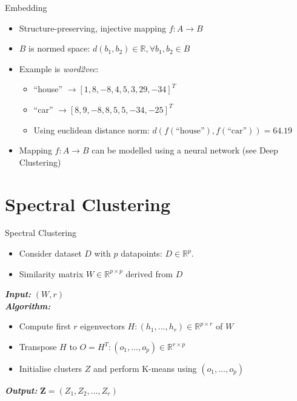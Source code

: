 \documentclass[xcolor=table,mathserif,9pt]{beamer}    %
\begin{document}
\begin{frame}{Embedding}

	\begin{itemize}
		\item Structure-preserving, injective mapping $f: A \to B$
		\item $B$ is normed space: $d(b_1,b_2) \in \mathbb{R}, \forall b_1,b_2 \in B$
		\item Example is \emph{word2vec}: 
			\begin{itemize}
				\item ``house'' $\to \left[1, 8, -8, 4, 5, 3, 29, -34\right]^{T}$
				\item ``car'' $\to \left[8,9, -8, 8, 5, 5, -34, -25\right]^{T}$
				\item Using euclidean distance norm: $d(f(\text{``house''}),f(\text{``car''})) = 64.19$ 
			\end{itemize}
		\item Mapping $f: A \to B$ can be modelled using a neural network (see Deep Clustering)
	\end{itemize}



\end{frame}

\section{Spectral Clustering}%
\label{sec:spectral_clustering}

\begin{frame}{Spectral Clustering}
\begin{itemize}
	\item Consider dataset $D$ with $p$ datapoints: $D \in \mathbb{R}^p$.
	\item Similarity matrix $W \in \mathbb{R}^{p \times p}$ derived from $D$
\end{itemize}
\vspace{10mm}
\begin{algorithm}[H]
	\LinesNumbered
	\emph{\textbf{Input: }} $(W, r)$ \\
	\emph{\textbf{Algorithm: }}
	\begin{itemize}
		\item Compute first $r$ eigenvectors $H: (h_1,... ,h_r) \in \mathbb{R}^{p \times r}$ of $W$ 
		\item Transpose $H$ to $O = H^T: (o_1,... ,o_p) \in \mathbb{R}^{r \times p}$ 
		\item Initialise clusters $Z$ and perform K-means \cite{Steinhaus56} using $(o_1,... ,o_p)$ 
	\end{itemize}
	\emph{\textbf{Output: }}$\textbf{Z} = (Z_1, Z_2, ..., Z_r)$
\end{algorithm}
\end{frame}
\end{document}
